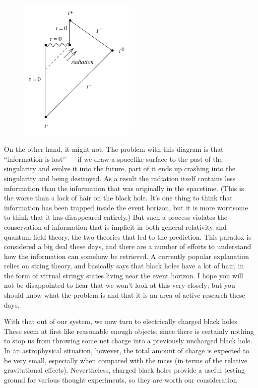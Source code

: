 \documentclass[12pt]{article}
\begin{document}
\begin{figure}[h]
  \centerline{
  \includegraphics[height=7cm]{pdf/seven27}}
\end{figure}

On the other hand, it might not.  The problem with this diagram is
that ``information is lost'' --- if we draw a spacelike surface
to the past of the singularity and evolve it into the future, part
of it ends up crashing into the singularity and being destroyed.
As a result the radiation itself contains less information than
the information that was originally in the spacetime.  (This is
the worse than a lack of hair on the black hole.  It's one thing
to think that information has been trapped inside the event horizon,
but it is more worrisome to think that it has disappeared entirely.)
 But such a process
violates the conservation of information that is implicit in both
general relativity and quantum field theory, the two theories that
led to the prediction.  This paradox is considered a big deal these
days, and there are a number of efforts to understand how the 
information can somehow be retrieved.  A currently popular explanation
relies on string theory, and basically says that black holes have a lot
of hair, in the form of virtual stringy states living near the event
horizon.  I hope you will not be disappointed to hear that we won't
look at this very closely; but you should know what the problem is
and that it is an area of active research these days.

With that out of our system, we now turn
to electrically charged black holes.  These
seem at first like reasonable enough objects, since there
is certainly nothing to stop us from throwing some net
charge into a previously uncharged black hole.  In an
astrophysical situation, however, the total amount of charge
is expected to be very small, especially when compared with
the mass (in terms of the relative gravitational effects).
Nevertheless, charged black holes provide a useful testing
ground for various thought experiments, so they are worth
our consideration.
\end{document}
